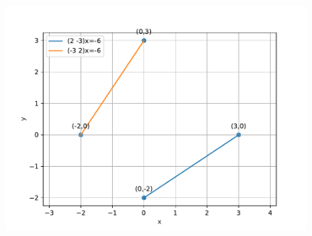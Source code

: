 \documentclass[10pt]{article}
\begin{document}
\begin{figure}[!h]
	\begin{center}
		\includegraphics[width=\columnwidth]{./figs/fig.pdf}
	\end{center}
\caption{}
\label{figure}
\end{figure}
\end{document}
